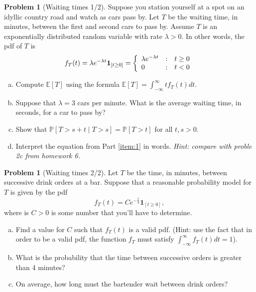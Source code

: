 \documentclass[10pt]{article}
\theoremstyle{definition}
\newtheorem{problem}[theorem]{Problem}
\newcommand{\1}[1]{\textbf{1}_{\left[#1\right]}} %
\def\E{\mathbb{E}} %
\def\P{\mathbb{P}} %
\begin{document}
\begin{problem}[Waiting times 1/2]
  Suppose you station yourself at a spot on an idyllic country road and watch
  as cars pass by. Let $T$ be the waiting time, in minutes, between the first
  and second cars to pass by. Assume $T$ is an exponentially distributed
  random variable with rate $\lambda>0$. In other words, the pdf of $T$ is
  \begin{equation*}
    f_{T}(t) 
    = \lambda e^{-\lambda t}\mathbf{1}_{\left[  t \geq 0\right] } 
    = \left\{ 
      \begin{array}{l@{\quad:\quad}l} \lambda e^{-\lambda t} & t \geq 0\\ 0& t<0 \end{array}\right.
  \end{equation*}

  \begin{enumerate}[(a)]
    \item Compute $\E\left[T \right]$ using the formula $\E\left[T \right] = \int_{-\infty}^{\infty} tf_{T}(t)dt$.
    \item Suppose that $\lambda=3$ cars per minute. What is the average waiting time, in seconds, for a
    car to pass by?
    \item \label{item:1} Show that
    $\P\left[ T>s+t\mid T>s\right] = \P\left[T>t \right]$ for all $t,s>0$.
    \item Interpret the equation from Part \ref{item:1} in words.
    \textit{Hint: compare with proble 2c from homework 6.} 
  \end{enumerate}
\end{problem}

\begin{problem}[Waiting times 2/2]
  Let $T$ be the time, in minutes, between successive drink orders at a bar. Suppose that a reasonable
  probability model for $T$ is given by the pdf
  \begin{equation*}
    f_{T}(t) = Ce^{-\frac{t}{4}} \mathbf{1}_{\left[ t \geq 0\right] },
  \end{equation*}
  where is $C>0$ is some number that you'll have to determine.
  \begin{enumerate}[(a)]
    \item Find a value for $C$ such that $f_{T}(t)$ is a valid pdf. (Hint: use the fact that in order to
    be a valid pdf, the function $f_{T}$ must satisfy $\int_{-\infty}^{\infty}f_{T}(t)dt=1$).
    \item What is the probability that the time between successive orders is greater than 4 minutes?
    \item On average, how long must the bartender wait between drink orders?
  \end{enumerate}
\end{problem}
\end{document}
